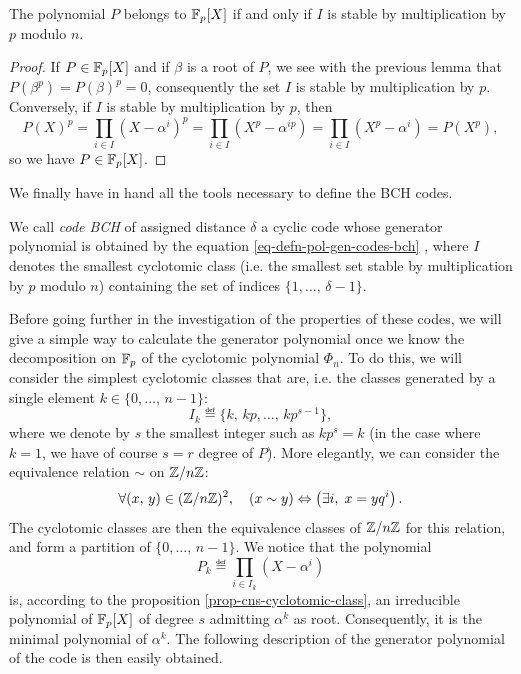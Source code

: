 \begin{prop}
\label{prop-cns-cyclotomic-class}
The polynomial $ P $ belongs to $ \mathbb{F}_p [X] $ if and only if $ I $ is stable by multiplication by $ p $ modulo $ n $.
\end{prop}

\begin{proof}
If $ P \in \mathbb{F}_p [X] $ and if $ \beta $ is a root of $ P $, we see with the previous lemma that $ P (\beta^p) = P (\beta)^p = 0 $, consequently the set $ I $ is stable by multiplication by $ p $. \\Conversely, if $ I $ is stable by multiplication by $ p $, then
\begin{equation*}
P (X)^p = \prod_{i \in I}{(X- \alpha^i)^p} = \prod_{i \in I}{(X^p- \alpha^{ip})} = \prod_{i \in I}{(X^p- \alpha^{i})} = P (X^p),
\end{equation*}
so we have $ P \in \mathbb{F}_p [X] $.
\end{proof}
We finally have in hand all the tools necessary to define the BCH codes.
 
\begin{defn}
 We call \textit{code BCH} of assigned distance $ \delta $ a cyclic code whose generator polynomial is obtained by the equation \eqref{eq-defn-pol-gen-codes-bch} , where $ I $ denotes the smallest cyclotomic class (i.e. the smallest set stable by multiplication by $ p $ modulo $ n $) containing the set of indices $ \{1, \ldots, \, \delta-1\} $.
\end{defn}

Before going further in the investigation of the properties of these codes, we will give a simple way to calculate the generator polynomial once we know the decomposition on $ \mathbb{F}_p $ of the cyclotomic polynomial $ \Phi_n $. To do this, we will consider the simplest cyclotomic classes that are, i.e. the classes generated by a single element $ k \in \{0, \ldots, \, n-1\} $:
\begin{equation}
\label{eq-defn-pol-cyclotomic-classes}
I_k \eqdef \{k, \, kp, \ldots, \, kp^{s-1}\},
\end{equation}
where we denote by $ s $ the smallest integer such as $ kp^s = k $ (in the case where $ k = 1 $, we have of course $ s = r $ degree of $ P $). More elegantly, we can consider the equivalence relation $ \sim $ on $ \mathbb{Z}/n \mathbb{Z} $:
\begin{equation*}
\forall (x, \, y) \in (\mathbb{Z}/n \mathbb{Z})^2, \quad (x \sim y) \Leftrightarrow \left(\exists i, \; x = yq^i \right).
\end{equation*}
The cyclotomic classes are then the equivalence classes of $ \mathbb{Z}/n \mathbb{Z} $ for this relation, and form a partition of $ \{0, \ldots, \, n-1\} $. We notice that the polynomial
\begin{equation}
\label{defn-pol-classes-cyclo-codes-bch}
P_k \eqdef \prod_{i \in I_k}{(X- \alpha^i)}
\end{equation}
is, according to the proposition \ref{prop-cns-cyclotomic-class}, an irreducible polynomial of $ \mathbb{F}_p [X] $ of degree $ s $ admitting $ \alpha^k $ as root. Consequently, it is the minimal polynomial of $ \alpha^k $. The following description of the generator polynomial of the code is then easily obtained.
 
